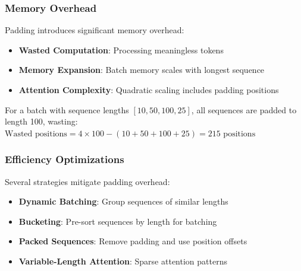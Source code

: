 \subsubsection{Memory Overhead}
Padding introduces significant memory overhead:
\begin{itemize}
\item \textbf{Wasted Computation}: Processing meaningless \pad{} tokens
\item \textbf{Memory Expansion}: Batch memory scales with longest sequence
\item \textbf{Attention Complexity}: Quadratic scaling includes padding positions
\end{itemize}

For a batch with sequence lengths $[10, 50, 100, 25]$, all sequences are padded to length 100, wasting:
$\text{Wasted positions} = 4 \times 100 - (10 + 50 + 100 + 25) = 215 \text{ positions}$

\subsubsection{Efficiency Optimizations}
Several strategies mitigate padding overhead:

\begin{itemize}
\item \textbf{Dynamic Batching}: Group sequences of similar lengths
\item \textbf{Bucketing}: Pre-sort sequences by length for batching
\item \textbf{Packed Sequences}: Remove padding and use position offsets
\item \textbf{Variable-Length Attention}: Sparse attention patterns
\end{itemize}

